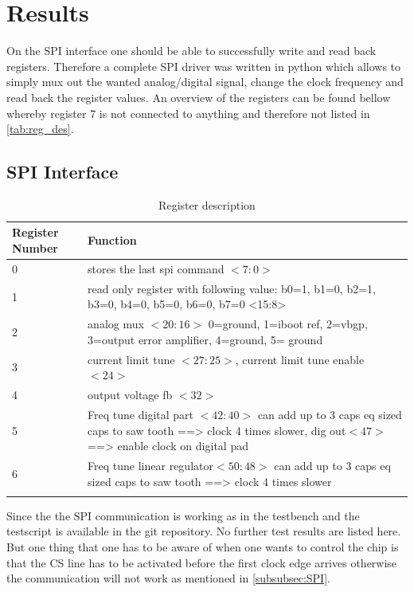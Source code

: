 \section{Results}
On the SPI interface one should be able to successfully write and read back registers. Therefore a complete SPI driver was written in python which allows to simply mux out the wanted analog/digital signal, change the clock frequency and read back the register values. An overview of the registers can be found bellow whereby register 7 is not connected to anything and therefore not listed in \autoref{tab:reg_des}.
\subsection{SPI Interface}
\begin{longtable}{|p{3.5cm}|p{10.5cm}|}
	\hline
	\rowcolor{lightgray}
	\textbf{Register Number} &\textbf{Function} \\ \hline
	0 & stores the last spi command $<7:0>$\\ \hline
    1 & read only register with following value: b0=1, b1=0, b2=1, b3=0, b4=0, b5=0, b6=0, b7=0 <15:8> \\ \hline
    2 & analog mux $<20:16>$ 0=ground, 1=iboot ref, 2=vbgp, 3=output error amplifier, 4=ground,  5= ground \\ \hline
	3 & current limit tune $<27:25>$, current limit tune enable $<24>$ \\ \hline
	4 & output voltage fb $<32>$ \\ \hline
	5 & Freq tune digital part $<42:40>$ can add up to 3 caps eq sized caps to saw tooth ==> clock 4 times slower, dig out$<47>$ ==> enable clock on digital pad\\ \hline
    6 & Freq tune linear regulator$<50:48>$ can add up to 3 caps eq sized caps to saw tooth ==> clock 4 times slower \\ \hline
	\caption{Register description} %
	\label{tab:reg_des}
\end{longtable}
Since the the SPI communication is working as in the testbench and the testscript is available in the git repository. No further test results are listed here. But one thing that one has to be aware of when one wants to control the chip is that the CS line has to be activated before the first clock edge arrives otherwise the communication will not work as mentioned in \autoref{subsubsec:SPI}.

